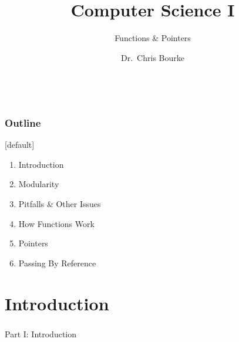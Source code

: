 \documentclass[]{beamer}
\title[~]{Computer Science I}
\subtitle{Functions \& Pointers}
\author[~]{Dr.\ Chris Bourke\\ \email{cbourke@cse.unl.edu}} %
\date{~}
\begin{document}
\begin{frame}
  \titlepage
\end{frame}


\begin{frame}
  \frametitle{Outline}

[default]
\begin{enumerate}
  \item Introduction
  \item Modularity
  \item Pitfalls \& Other Issues
  \item How Functions Work
  \item Pointers
  \item Passing By Reference
\end{enumerate}

\end{frame}

\section{Introduction}

\begin{frame}
    \frametitle{}
    \framesubtitle{}
    
    \begin{center}
    {\Huge Part I: Introduction}\\
    {\Large ~}
    \end{center}

\end{frame}
\end{document}
